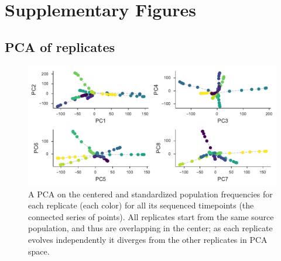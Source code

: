 \documentclass[11pt]{article}
\DeclareMathOperator{\var}{Var}
\begin{document}
{{%


\setcounter{section}{1}
\section*{Supplementary Figures}

\subsection{PCA of \textcite{Barghi2019-qy} replicates}

\begin{figure}[!ht]
  \centering

  \includegraphics[]{figures/barghi-panel-pca.pdf}

  \caption{A PCA on the centered and standardized population frequencies for
  each replicate (each color) for all its sequenced timepoints (the connected
  series of points). All replicates start from the same source population, and
  thus are overlapping in the center; as each replicate evolves independently it
  diverges from the other replicates in PCA space.}
  

\end{figure}}}
\end{document}
